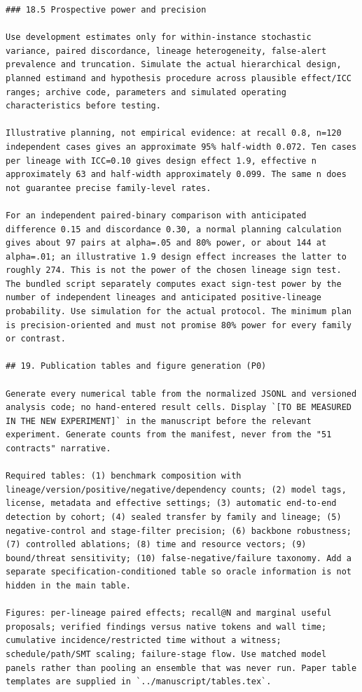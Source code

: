 \documentclass[11pt,a4paper]{article}
\begin{document}
\begin{verbatim}
### 18.5 Prospective power and precision

Use development estimates only for within-instance stochastic variance, paired discordance, lineage heterogeneity, false-alert prevalence and truncation. Simulate the actual hierarchical design, planned estimand and hypothesis procedure across plausible effect/ICC ranges; archive code, parameters and simulated operating characteristics before testing.

Illustrative planning, not empirical evidence: at recall 0.8, n=120 independent cases gives an approximate 95% half-width 0.072. Ten cases per lineage with ICC=0.10 gives design effect 1.9, effective n approximately 63 and half-width approximately 0.099. The same n does not guarantee precise family-level rates.

For an independent paired-binary comparison with anticipated difference 0.15 and discordance 0.30, a normal planning calculation gives about 97 pairs at alpha=.05 and 80% power, or about 144 at alpha=.01; an illustrative 1.9 design effect increases the latter to roughly 274. This is not the power of the chosen lineage sign test. The bundled script separately computes exact sign-test power by the number of independent lineages and anticipated positive-lineage probability. Use simulation for the actual protocol. The minimum plan is precision-oriented and must not promise 80% power for every family or contrast.

## 19. Publication tables and figure generation (P0)

Generate every numerical table from the normalized JSONL and versioned analysis code; no hand-entered result cells. Display `[TO BE MEASURED IN THE NEW EXPERIMENT]` in the manuscript before the relevant experiment. Generate counts from the manifest, never from the "51 contracts" narrative.

Required tables: (1) benchmark composition with lineage/version/positive/negative/dependency counts; (2) model tags, license, metadata and effective settings; (3) automatic end-to-end detection by cohort; (4) sealed transfer by family and lineage; (5) negative-control and stage-filter precision; (6) backbone robustness; (7) controlled ablations; (8) time and resource vectors; (9) bound/threat sensitivity; (10) false-negative/failure taxonomy. Add a separate specification-conditioned table so oracle information is not hidden in the main table.

Figures: per-lineage paired effects; recall@N and marginal useful proposals; verified findings versus native tokens and wall time; cumulative incidence/restricted time without a witness; schedule/path/SMT scaling; failure-stage flow. Use matched model panels rather than pooling an ensemble that was never run. Paper table templates are supplied in `../manuscript/tables.tex`.


\end{verbatim}
\end{document}
